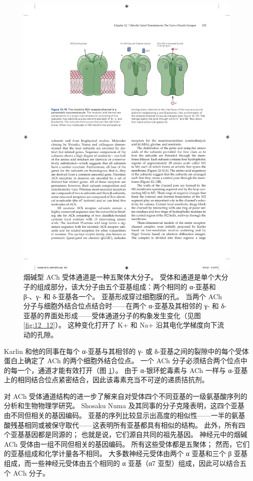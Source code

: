 \begin{figure}[htbp]
	\centering
	\includegraphics[width=0.8\linewidth]{chap12/fig_12_10}
	\caption{烟碱型 ACh 受体通道是一种五聚体大分子。 受体和通道是单个大分子的组成部分，该大分子由五个亚基组成：两个相同的 α-亚基和 β-、γ- 和 δ-亚基各一个。 亚基形成穿过细胞膜的孔。 当两个 ACh 分子与细胞外结合位点结合时——在两个 α-亚基及其相邻的 γ- 和 δ-亚基的界面处形成——受体通道分子的构象发生变化（见图 \ref{fig:12_12}）。 这种变化打开了 K+ 和 Na+ 沿其电化学梯度向下流动的孔隙。}
	\label{fig:12_10}
\end{figure}


Karlin 和他的同事在每个 α-亚基与其相邻的 γ- 或 δ-亚基之间的裂隙中的每个受体蛋白上确定了 ACh 的两个细胞外结合位点。 
一个 ACh 分子必须结合两个位点中的每一个，通道才能有效打开（图 \ref{fig:12_10}）。 
由于 α-银环蛇毒素与 ACh 一样与 α-亚基上的相同结合位点紧密结合，因此该毒素充当不可逆的递质拮抗剂。


对 ACh 受体通道结构的进一步了解来自对受体四个不同亚基的一级氨基酸序列的分析和生物物理学研究。 
Shosaku Numa 及其同事的分子克隆表明，这四个亚基由不同但相关的基因编码。 
亚基的序列比较显示出高度的相似性——一半的氨基酸残基相同或被保守取代——这表明所有亚基都具有相似的结构。 
此外，所有四个亚基基因都是同源的； 也就是说，它们源自共同的祖先基因。 
神经元中的烟碱 ACh 受体由一组不同但相关的基因编码。 
所有这些受体都是五聚体； 然而，它们的亚基组成和化学计量各不相同。 
大多数神经元受体由两个 α 亚基和三个 β 亚基组成，而一些神经元受体由五个相同的 α 亚基（α7 亚型）组成，因此可以结合五个 ACh 分子。


